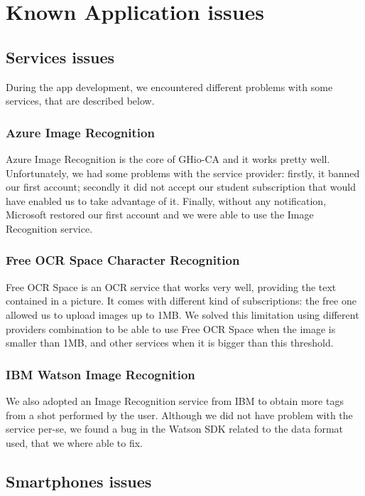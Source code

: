 \section{Known Application issues}
\label{sec:issues}

\subsection{Services issues}

During the app development, we encountered different problems with some services, 
that are described below.

\subsubsection{Azure Image Recognition}

Azure Image Recognition is the core of GHio-CA and it works pretty well. 
Unfortunately, we had some problems with the service provider: firstly, it 
banned our first account; secondly it did not accept our student subscription 
that would have enabled us to take advantage of it. Finally, without any 
notification, Microsoft restored our first account and we were able to use the 
Image Recognition service.

\subsubsection{Free OCR Space Character Recognition}

Free OCR Space is an OCR service that works very well, providing the text 
contained in a picture. It comes with different kind of subscriptions: the free 
one allowed us to upload images up to 1MB. We solved this limitation using 
different providers combination to be able to use Free OCR Space when the image 
is smaller than 1MB, and other services when it is bigger than this threshold.

\subsubsection{IBM Watson Image Recognition}

We also adopted an Image Recognition service from IBM to obtain more 
tags from a shot performed by the user. Although we did not have problem with 
the service per-se, we found a bug in the Watson SDK related to the data format 
used, that we where able to fix.

\subsection{Smartphones issues}

